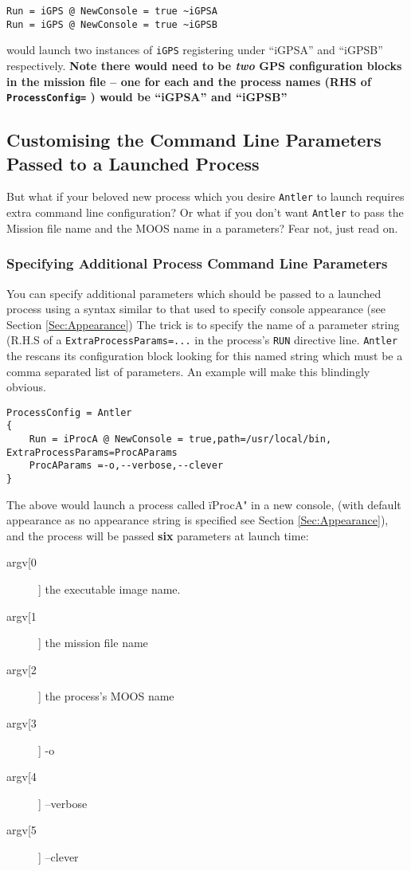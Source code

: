 \documentclass[a4paper,10pt]{article}
\newcommand{\Code}[1]{\texttt{#1} }
\newcommand{\code}[1]{\Code{#1} }
\begin{document}
\begin{lstlisting}
Run = iGPS @ NewConsole = true ~iGPSA
Run = iGPS @ NewConsole = true ~iGPSB
\end{lstlisting}

would launch two instances of \code{iGPS} registering under
``iGPSA'' and ``iGPSB'' respectively. {\textbf{Note there would need to be
\emph{two} GPS configuration blocks in the mission file -- one for
each and the process names  (RHS of \code{ProcessConfig=}) would be ``iGPSA'' and ``iGPSB''}}





\subsection{Customising the Command Line Parameters Passed to a Launched Process}
But what if your beloved new process which you desire \code{Antler} to launch requires extra command line configuration? Or what if you don't want \code{Antler} to pass the Mission file name and the MOOS name in a parameters? Fear not, just read on.

\subsubsection{Specifying Additional Process Command Line Parameters}

You can specify additional parameters which should be passed to a launched process using a syntax similar to that used to specify console appearance (see Section \ref{Sec:Appearance}) The trick is to specify the name of a parameter string (R.H.S of a \code{ExtraProcessParams=...} in the process's \code{RUN} directive line. \code{Antler} the rescans its configuration block looking for this named string which must be a comma separated list of parameters. An example will make this blindingly obvious.

\begin{lstlisting}
ProcessConfig = Antler
{
	Run = iProcA @ NewConsole = true,path=/usr/local/bin, ExtraProcessParams=ProcAParams 
	ProcAParams =-o,--verbose,--clever
}
\end{lstlisting}

The above would launch a process called \"iProcA" in a new console, (with default appearance as no appearance string is specified see Section \ref{Sec:Appearance}), and the process will be passed {\textbf{six}} parameters at launch time:
\begin{description}
\item [argv[0]] the executable image name. 
\item [argv[1]] the mission file name
\item [argv[2]] the process's MOOS name
\item [argv[3]] -o
\item [argv[4]] --verbose
\item [argv[5]] --clever
\end{description}
\end{document}
